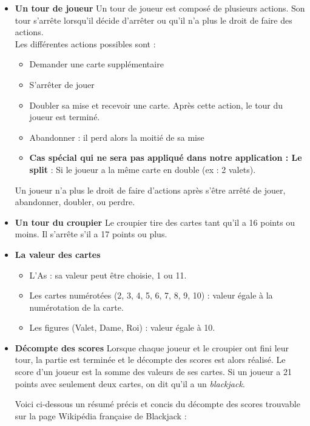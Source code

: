 \documentclass{article}
\begin{document}
\begin{itemize}
    
    \item \textbf{Un tour de joueur} \newline
    Un tour de joueur est composé de plusieurs actions. Son tour s'arrête lorsqu'il décide d'arrêter ou qu'il n'a plus le droit de faire des actions.\\
    Les différentes actions possibles sont :
    \begin{itemize}
        \item Demander une carte supplémentaire
        \item S'arrêter de jouer
        \item Doubler sa mise et recevoir une carte. Après cette action, le tour du joueur est terminé.
        \item Abandonner : il perd alors la moitié de sa mise
        \item \textbf{Cas spécial qui ne sera pas appliqué dans notre application : Le split} : Si le joueur a la même carte en double (ex : 2 valets).
    \end{itemize}
    Un joueur n'a plus le droit de faire d'actions après s'être arrêté de jouer, abandonner, doubler, ou perdre.
    
    \item \textbf{Un tour du croupier} \newline
    Le croupier tire des cartes tant qu'il a 16 points ou moins. Il s'arrête s'il a 17 points ou plus.

    \item \textbf{La valeur des cartes} 
    \begin{itemize}
        \item L'As : sa valeur peut être choisie, 1 ou 11.
        \item Les cartes numérotées (2, 3, 4, 5, 6, 7, 8, 9, 10) : valeur égale à la numérotation de la carte.
        \item Les figures (Valet, Dame, Roi) : valeur égale à 10.
    \end{itemize}

    \item \textbf{Décompte des scores} \newline
    Lorsque chaque joueur et le croupier ont fini leur tour, la partie est terminée et le décompte des scores est alors réalisé.
    Le score d'un joueur est la somme des valeurs de ses cartes.
    Si un joueur a 21 points avec seulement deux cartes, on dit qu'il a un \textit{blackjack}.
    
    Voici ci-dessous un résumé précis et concis du décompte des scores trouvable sur la page Wikipédia française de Blackjack : 


\end{itemize}
\end{document}
